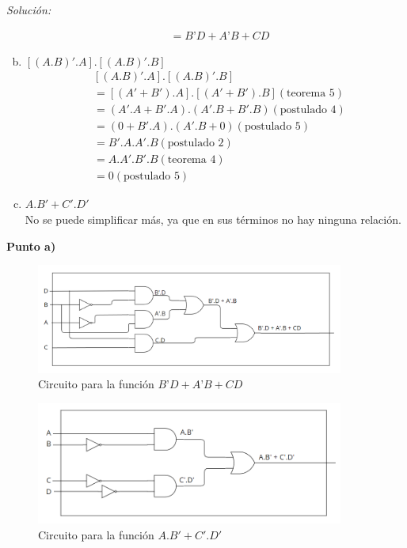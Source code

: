 \documentclass{article}
\newenvironment{solution}
    {\textit{Solución:}}
    {}
\begin{document}
\begin{solution}
\begin{enumerate}[a)]
\begin{align*}
        &= B’D + A’B + CD
    \end{align*}
    \item $[(A.B)'.A].[(A.B)'.B]$\\
    \begin{align*}
        & [(A.B)'.A].[(A.B)'.B] \\
        &= [(A' + B').A].[(A' + B').B] (\text{teorema 5})\\
        &= (A'.A + B'.A).(A'.B + B'.B) (\text{postulado 4})\\
        &= (0 + B'.A).(A'.B + 0) (\text{postulado 5})\\
        &= B'.A.A'.B (\text{postulado 2})\\
        &= A.A'.B'.B (\text{teorema 4})\\
        &= 0 (\text{postulado 5})
    \end{align*}
    \item $A.B' + C'.D'$\\
    No se puede simplificar más, ya que en sus términos no hay ninguna relación.
\end{enumerate}


\textbf{Punto a)}\\
\begin{figure}[h]
    \centering
    \includegraphics[width=0.9\textwidth]{tp02fig1.png}
    \caption{Circuito para la función $B’D + A’B + CD$}
\end{figure}

\newpage 
\begin{figure}[h]
    \centering
    \includegraphics[width=0.9\textwidth]{tp02fig2.png}
    \caption{Circuito para la función $A.B' + C'.D'$}
\end{figure}


\end{solution}
\end{document}
